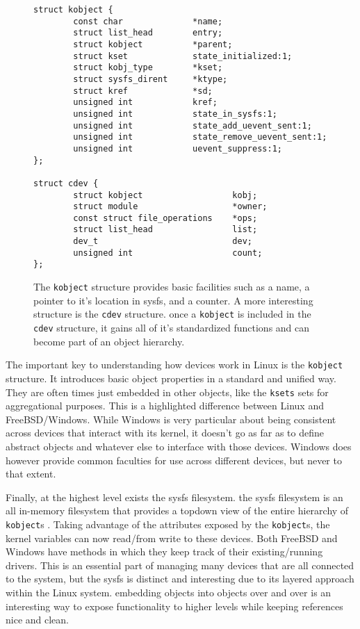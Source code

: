 \documentclass[10pt,draftclsnofoot,onecolumn]{IEEEtran}
\begin{document}
\begin{figure}[h]
\begin{lstlisting}
struct kobject {
        const char              *name;
        struct list_head        entry;
        struct kobject          *parent;
        struct kset             state_initialized:1;
        struct kobj_type        *kset;
        struct sysfs_dirent     *ktype;
        struct kref             *sd;
        unsigned int            kref;
        unsigned int            state_in_sysfs:1;
        unsigned int            state_add_uevent_sent:1;
        unsigned int            state_remove_uevent_sent:1;
        unsigned int            uevent_suppress:1;
};

struct cdev {
        struct kobject                  kobj;
        struct module                   *owner;
        const struct file_operations    *ops;
        struct list_head                list;
        dev_t                           dev;
        unsigned int                    count;
};
\end{lstlisting}
\centering
\captionsetup{justification=centering}
\caption{
  The \texttt{kobject} structure provides basic facilities such as a name, a pointer to it's location in sysfs, and a counter.
  A more interesting structure is the \texttt{cdev} structure.
  once a \texttt{kobject} is included in the \texttt{cdev} structure, it gains all of it's standardized functions and can become part of an object hierarchy.
}
\label{code:kobject_struct}
\end{figure}

\par The important key to understanding how devices work in Linux is the \texttt{kobject} structure.
It introduces basic object properties in a standard and unified way.
They are often times just embedded in other objects, like the \texttt{ksets} sets for aggregational purposes.
This is a highlighted difference between Linux and FreeBSD/Windows.
While Windows is very particular about being consistent across devices that interact with its kernel, it doesn't go as far as to define abstract objects and whatever else to interface with those devices.
Windows does however provide common faculties for use across different devices, but never to that extent.

\par Finally, at the highest level exists the sysfs filesystem.
the sysfs filesystem is an all in-memory filesystem that provides a topdown view of the entire hierarchy of \texttt{kobject}s \cite{linux:1}.
Taking advantage of the attributes exposed by the \texttt{kobject}s, the kernel variables can now read/from write to these devices.
Both FreeBSD and Windows have methods in which they keep track of their existing/running drivers.
This is an essential part of managing many devices that are all connected to the system, but the sysfs is distinct and interesting due to its layered approach within the Linux system.
embedding objects into objects over and over is an interesting way to expose functionality to higher levels while keeping references nice and clean.\\
\end{document}
